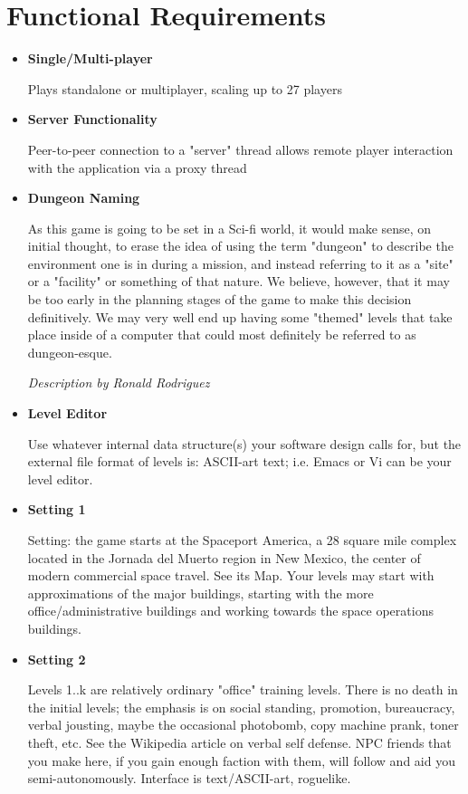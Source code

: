 \documentclass[12pt]{article}
\begin{document}
\section{Functional Requirements}
\begin{itemize}
	\item \textbf{Single/Multi-player}
	
	Plays standalone or multiplayer, scaling up to 27 players
	
	\item \textbf{Server Functionality}
	
	Peer-to-peer connection to a "server" thread allows remote player
	interaction with the application via a proxy thread
	
	\item \textbf{Dungeon Naming} 
	
	As this game is going to be set in a Sci-fi world, it would make sense, on 
	initial thought, to erase the idea of using the term "dungeon" to describe 
	the environment one is in during a mission, and instead referring to it as 
	a "site" or a "facility" or something of that nature. We believe, however, 
	that it may be too early in the planning stages of the game to make this 
	decision definitively. We may very well end up having some "themed" levels 
	that take place inside of a computer that could most definitely be referred 
	to as dungeon-esque. 
	
	\emph{Description by Ronald Rodriguez}
	
	\item \textbf{Level Editor}
	
	Use whatever internal data structure(s) your software design calls
	for, but the external file format of levels is: ASCII-art text; i.e.
	Emacs or Vi can be your level editor.
	
	\item \textbf{Setting 1}
	
	Setting: the game starts at the Spaceport America, a 28 square mile
	complex located in the Jornada del Muerto region in New Mexico, the
	center of modern commercial space travel. See its Map. Your levels may
	start with approximations of the major buildings, starting with the more
	office/administrative buildings and working towards the space operations
	buildings.
	
	\item \textbf{Setting 2}
	
	Levels 1..k are relatively ordinary "office" training levels. There is
	no death in the initial levels; the emphasis is on social standing,
	promotion, bureaucracy, verbal jousting, maybe the occasional photobomb,
	copy machine prank, toner theft, etc. See the Wikipedia article on
	verbal self defense. NPC friends that you make here, if you gain enough
	faction with them, will follow and aid you semi-autonomously. Interface
	is text/ASCII-art, roguelike. 
	

\end{itemize}
\end{document}
